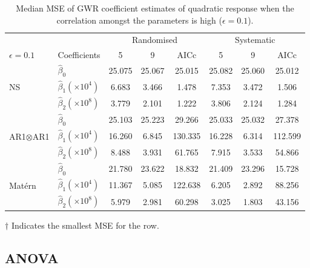 \documentclass[a4paper]{article} 	%
\newcommand{\Matern}{Mat\'ern }
\begin{document}
\begin{table}[H]
	\centering
\begin{threeparttable}
	\caption{Median MSE of GWR coefficient estimates of quadratic response when the correlation amongst the parameters is high ($\epsilon=0.1$).}\label{tb:MSEquadraticHigh}
	\begin{tabular}{llcccccc} \toprule
		&  & \multicolumn{3}{c}{Randomised} & \multicolumn{3}{c}{Systematic} \\ 
		$\epsilon=0.1$  & Coefficients & 5  & 9  & AICc & 5  & 9  & AICc \\ \midrule
		\multirow{3}{*}{NS} & $\hat{\beta}_0$  & 25.075 & 25.067 & 25.015  & 25.082 & 25.060 & 25.012\tnote{$\dagger$} \\
		&$\hat{\beta}_1 (\times 10^4)$  & 6.683  & 3.466  & 1.478\tnote{$\dagger$} & 7.353  & 3.472  & 1.506 \\
		&$\hat{\beta}_2 (\times 10^8)$  & 3.779  & 2.101  & 1.222\tnote{$\dagger$} & 3.806  & 2.124  & 1.284 \\  \midrule
		\multirow{3}{*}{AR1$\otimes$AR1} & $\hat{\beta}_0$  & 25.103 & 25.223 & 29.266  & 25.033 & 25.032\tnote{$\dagger$} & 27.378 \\
		& $\hat{\beta}_1 (\times 10^4)$ & 16.260 & 6.845  & 130.335 & 16.228 & 6.314\tnote{$\dagger$}  & 112.599  \\
		& $\hat{\beta}_2 (\times 10^8)$  & 8.488  & 3.931  & 61.765  & 7.915  & 3.533\tnote{$\dagger$}  & 54.866  \\  \midrule
		\multirow{3}{*}{\Matern} & $\hat{\beta}_0$ & 21.780 & 23.622 & 18.832  & 21.409 & 23.296 & 15.728\tnote{$\dagger$}  \\
		& $\hat{\beta}_1 (\times 10^4)$ & 11.367 & 5.085  & 122.638 & 6.205  & 2.892\tnote{$\dagger$}  & 88.256 \\
		& $\hat{\beta}_2 (\times 10^8)$  & 5.979  & 2.981  & 60.298  & 3.025  & 1.803\tnote{$\dagger$}  & 43.156  \\ \bottomrule
	\end{tabular}
		    \begin{tablenotes}
	        \item[$\dagger$] \footnotesize Indicates the smallest MSE for the row.
	    \end{tablenotes}
\end{threeparttable}
\end{table}


\subsection{ANOVA}\label{Sec:anova}
\end{document}
